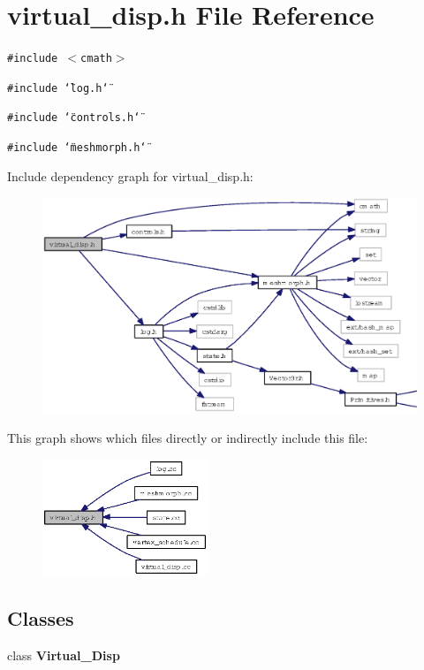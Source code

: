 \section{virtual\_\-disp.h File Reference}
\label{virtual__disp_8h}
{\tt \#include $<$cmath$>$}\par
{\tt \#include \char`\"{}log.h\char`\"{}}\par
{\tt \#include \char`\"{}controls.h\char`\"{}}\par
{\tt \#include \char`\"{}meshmorph.h\char`\"{}}\par


Include dependency graph for virtual\_\-disp.h:\begin{figure}[H]
\begin{center}
\leavevmode
\includegraphics[width=332pt]{virtual__disp_8h__incl}
\end{center}
\end{figure}


This graph shows which files directly or indirectly include this file:\begin{figure}[H]
\begin{center}
\leavevmode
\includegraphics[width=140pt]{virtual__disp_8h__dep__incl}
\end{center}
\end{figure}
\subsection*{Classes}
\begin{CompactItemize}
\item 
class {\bf Virtual\_\-Disp}
\end{CompactItemize}

